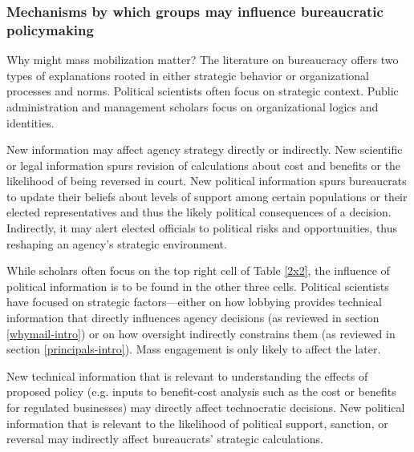 \subsubsection{Mechanisms by which groups may influence bureaucratic policymaking}


Why might mass mobilization matter? The literature on bureaucracy offers two types of explanations rooted in either strategic behavior or organizational processes and norms. Political scientists often focus on strategic context. Public administration and management scholars focus on organizational logics and identities. 

New information may affect agency strategy directly or indirectly. New scientific or legal information spurs revision of calculations about cost and benefits or the likelihood of being reversed in court. New political information spurs bureaucrats to update their beliefs about levels of support among certain populations or their elected representatives and thus the likely political consequences of a decision. Indirectly, it may alert elected officials to political risks and opportunities, thus reshaping an agency's strategic environment.

While scholars often focus on the top right cell of Table \ref{2x2}, the influence of political information is to be found in the other three cells. Political scientists have focused on strategic factors---either on how lobbying provides technical information that directly influences agency decisions (as reviewed in section \ref{whymail-intro}) or on how oversight indirectly constrains them (as reviewed in section \ref{principals-intro}).  Mass engagement is only likely to affect the later.

New technical information that is relevant to understanding the effects of proposed policy (e.g. inputs to benefit-cost analysis such as the cost or benefits for regulated businesses) may directly affect technocratic decisions. 
New political information that is relevant to the likelihood of political support, sanction, or reversal may indirectly affect bureaucrats' strategic calculations.

